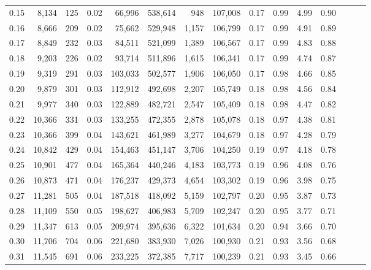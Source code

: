 \begin{tabular}{rrrrrrrrrrrrrrr}
0.15 &   8,134 &    125 &  0.02 &   66,996 &  538,614 &      948 &  107,008 &  0.17 &  0.99 &  4.99 &      0.90 \\
0.16 &   8,666 &    209 &  0.02 &   75,662 &  529,948 &    1,157 &  106,799 &  0.17 &  0.99 &  4.91 &      0.89 \\
0.17 &   8,849 &    232 &  0.03 &   84,511 &  521,099 &    1,389 &  106,567 &  0.17 &  0.99 &  4.83 &      0.88 \\
0.18 &   9,203 &    226 &  0.02 &   93,714 &  511,896 &    1,615 &  106,341 &  0.17 &  0.99 &  4.74 &      0.87 \\
0.19 &   9,319 &    291 &  0.03 &  103,033 &  502,577 &    1,906 &  106,050 &  0.17 &  0.98 &  4.66 &      0.85 \\
0.20 &   9,879 &    301 &  0.03 &  112,912 &  492,698 &    2,207 &  105,749 &  0.18 &  0.98 &  4.56 &      0.84 \\
0.21 &   9,977 &    340 &  0.03 &  122,889 &  482,721 &    2,547 &  105,409 &  0.18 &  0.98 &  4.47 &      0.82 \\
0.22 &  10,366 &    331 &  0.03 &  133,255 &  472,355 &    2,878 &  105,078 &  0.18 &  0.97 &  4.38 &      0.81 \\
0.23 &  10,366 &    399 &  0.04 &  143,621 &  461,989 &    3,277 &  104,679 &  0.18 &  0.97 &  4.28 &      0.79 \\
0.24 &  10,842 &    429 &  0.04 &  154,463 &  451,147 &    3,706 &  104,250 &  0.19 &  0.97 &  4.18 &      0.78 \\
0.25 &  10,901 &    477 &  0.04 &  165,364 &  440,246 &    4,183 &  103,773 &  0.19 &  0.96 &  4.08 &      0.76 \\
0.26 &  10,873 &    471 &  0.04 &  176,237 &  429,373 &    4,654 &  103,302 &  0.19 &  0.96 &  3.98 &      0.75 \\
0.27 &  11,281 &    505 &  0.04 &  187,518 &  418,092 &    5,159 &  102,797 &  0.20 &  0.95 &  3.87 &      0.73 \\
0.28 &  11,109 &    550 &  0.05 &  198,627 &  406,983 &    5,709 &  102,247 &  0.20 &  0.95 &  3.77 &      0.71 \\
0.29 &  11,347 &    613 &  0.05 &  209,974 &  395,636 &    6,322 &  101,634 &  0.20 &  0.94 &  3.66 &      0.70 \\
0.30 &  11,706 &    704 &  0.06 &  221,680 &  383,930 &    7,026 &  100,930 &  0.21 &  0.93 &  3.56 &      0.68 \\
0.31 &  11,545 &    691 &  0.06 &  233,225 &  372,385 &    7,717 &  100,239 &  0.21 &  0.93 &  3.45 &      0.66 \\

\end{tabular}
